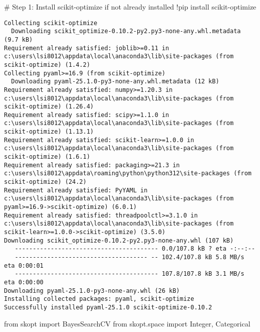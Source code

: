 \documentclass[
  letterpaper,
  DIV=11,
  numbers=noendperiod]{scrreprt}
\newenvironment{Shaded}{\begin{snugshade}}{\end{snugshade}}
\newcommand{\CommentTok}[1]{\textcolor[rgb]{0.37,0.37,0.37}{#1}}
\newcommand{\ImportTok}[1]{\textcolor[rgb]{0.00,0.46,0.62}{#1}}
\newcommand{\NormalTok}[1]{\textcolor[rgb]{0.00,0.23,0.31}{#1}}
\newcommand{\OperatorTok}[1]{\textcolor[rgb]{0.37,0.37,0.37}{#1}}
\begin{document}
\begin{Shaded}
\begin{Highlighting}[]
\CommentTok{\# Step 1: Install scikit{-}optimize if not already installed}
\OperatorTok{!}\NormalTok{pip install scikit}\OperatorTok{{-}}\NormalTok{optimize}
\end{Highlighting}
\end{Shaded}

\begin{verbatim}
Collecting scikit-optimize
  Downloading scikit_optimize-0.10.2-py2.py3-none-any.whl.metadata (9.7 kB)
Requirement already satisfied: joblib>=0.11 in c:\users\lsi8012\appdata\local\anaconda3\lib\site-packages (from scikit-optimize) (1.4.2)
Collecting pyaml>=16.9 (from scikit-optimize)
  Downloading pyaml-25.1.0-py3-none-any.whl.metadata (12 kB)
Requirement already satisfied: numpy>=1.20.3 in c:\users\lsi8012\appdata\local\anaconda3\lib\site-packages (from scikit-optimize) (1.26.4)
Requirement already satisfied: scipy>=1.1.0 in c:\users\lsi8012\appdata\local\anaconda3\lib\site-packages (from scikit-optimize) (1.13.1)
Requirement already satisfied: scikit-learn>=1.0.0 in c:\users\lsi8012\appdata\local\anaconda3\lib\site-packages (from scikit-optimize) (1.6.1)
Requirement already satisfied: packaging>=21.3 in c:\users\lsi8012\appdata\roaming\python\python312\site-packages (from scikit-optimize) (24.2)
Requirement already satisfied: PyYAML in c:\users\lsi8012\appdata\local\anaconda3\lib\site-packages (from pyaml>=16.9->scikit-optimize) (6.0.1)
Requirement already satisfied: threadpoolctl>=3.1.0 in c:\users\lsi8012\appdata\local\anaconda3\lib\site-packages (from scikit-learn>=1.0.0->scikit-optimize) (3.5.0)
Downloading scikit_optimize-0.10.2-py2.py3-none-any.whl (107 kB)
   ---------------------------------------- 0.0/107.8 kB ? eta -:--:--
   ------------------------------------- -- 102.4/107.8 kB 5.8 MB/s eta 0:00:01
   ---------------------------------------- 107.8/107.8 kB 3.1 MB/s eta 0:00:00
Downloading pyaml-25.1.0-py3-none-any.whl (26 kB)
Installing collected packages: pyaml, scikit-optimize
Successfully installed pyaml-25.1.0 scikit-optimize-0.10.2
\end{verbatim}

\begin{Shaded}
\begin{Highlighting}[]
\ImportTok{from}\NormalTok{ skopt }\ImportTok{import}\NormalTok{ BayesSearchCV}
\ImportTok{from}\NormalTok{ skopt.space }\ImportTok{import}\NormalTok{ Integer, Categorical}
\end{Highlighting}
\end{Shaded}
\end{document}
